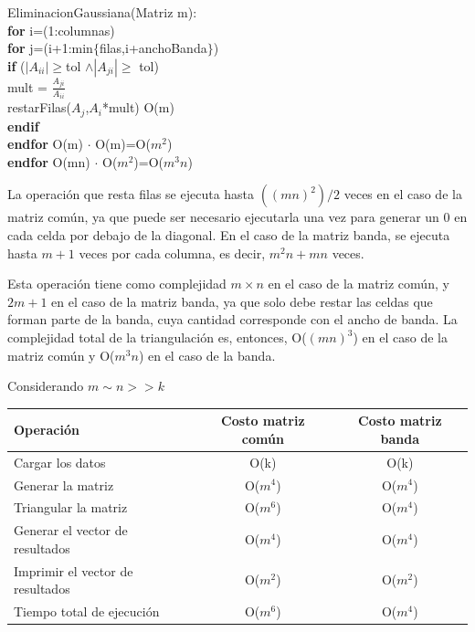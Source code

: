 \documentclass[a4paper]{article}
\begin{document}
\begin{codesnippet}

EliminacionGaussiana(Matriz m):\\
\textbf{for} i=(1:columnas)\\
\tab \textbf{for} j=(i+1:min$\{$filas,i+anchoBanda$\}$)\\
\tab \tab \textbf{if} ($|A_{ii}| \geq$tol $\wedge |A_{ji}| \geq$ tol)\\
\tab \tab \tab mult = $\frac{A_{ji}}{A_{ii}}$\\
\tab \tab \tab restarFilas($A_{j}$,$A_{i}$*mult) \hfill O(m)\\
\tab \tab \textbf{endif}\\
\tab \textbf{endfor} \hfill O(m) $\cdot$ O(m)=O($m^2$)\\
\textbf{endfor} \hfill O(mn) $\cdot$ O($m^2$)=O($m^3n$)\\

\end{codesnippet}
La operación que resta filas se ejecuta hasta $((mn)^2)/2$ veces en el caso de la matriz común, ya que puede ser necesario ejecutarla una vez para generar un 0 en cada celda por debajo de la diagonal. En el caso de la matriz banda, se ejecuta hasta $m+1$ veces por cada columna, es decir, $m^2n+mn$ veces.

Esta operación tiene como complejidad $m \times n$ en el caso de la matriz común, y $2m+1$ en el caso de la matriz banda, ya que solo debe restar las celdas que forman parte de la banda, cuya cantidad corresponde con el ancho de banda. La complejidad total de la triangulación es, entonces, O($(mn)^3$) en el caso de la matriz común y O($m^3n$) en el caso de la banda. 

Considerando $m \sim n>>k$

\begin{tabular}{ l|c c }
  Operación & Costo matriz común & Costo matriz banda \\
 \hline
  Cargar los datos & O(k) & O(k)  \\
  Generar la matriz & O($m^4$) & O($m^4$) \\
  Triangular la matriz & O($m^6$) & O($m^4$) \\
  Generar el vector de resultados & O($m^4$) & O($m^4$)\\
  Imprimir el vector de resultados & O($m^2$) & O($m^2$)\\
  Tiempo total de ejecución & O($m^6$) & O($m^4$)
\end{tabular} \\ \\
\end{document}
